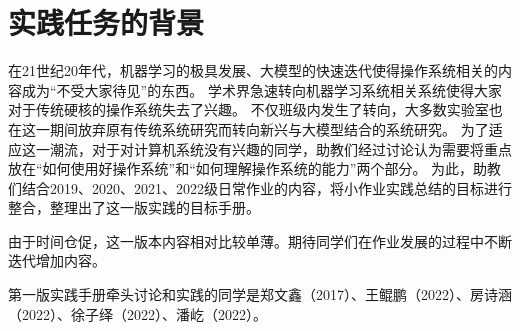 \chapter*{实践任务的背景}

在21世纪20年代，机器学习的极具发展、大模型的快速迭代使得操作系统相关的内容成为“不受大家待见”的东西。
学术界急速转向机器学习系统相关系统使得大家对于传统硬核的操作系统失去了兴趣。
不仅班级内发生了转向，大多数实验室也在这一期间放弃原有传统系统研究而转向新兴与大模型结合的系统研究。
为了适应这一潮流，对于对计算机系统没有兴趣的同学，助教们经过讨论认为需要将重点放在“如何使用好操作系统”和“如何理解操作系统的能力”两个部分。
为此，助教们结合2019、2020、2021、2022级日常作业的内容，将小作业实践总结的目标进行整合，整理出了这一版实践的目标手册。

由于时间仓促，这一版本内容相对比较单薄。期待同学们在作业发展的过程中不断迭代增加内容。

第一版实践手册牵头讨论和实践的同学是郑文鑫（2017）、王鲲鹏（2022）、房诗涵（2022）、徐子绎（2022）、潘屹（2022）。